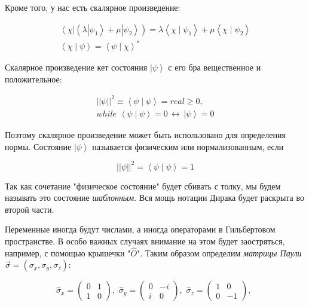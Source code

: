 \documentclass[main.tex]{subfiles}
\begin{document}
Кроме того, у нас есть скалярное произведение:

\begin{align}\label{inproduct}
	\left<\chi\right| \left( \lambda \left|\psi_1\right> + \mu\left|\psi_2\right> \right) = \lambda\left<\chi\mid\psi_1\right> + \mu\left<\chi\mid\psi_2\right> \\
	 \left<\chi\mid\psi\right> = \left<\psi\mid\chi\right>^*
\end{align}

Скалярное произведение кет состояния $\left|\psi\right>$ с его бра вещественное и положительное:

\begin{align}\label{1.2}
	||\psi||^2 \equiv \left<\psi\mid\psi\right> = real\ge 0,\\
	while \,\, \left<\psi\mid\psi\right> = 0 \,\leftrightarrow \, \left|\psi\right> = 0 
\end{align}

Поэтому скалярное произведение может быть использовано для определения нормы. Состояние $\left|\psi\right>$ называется физическим или нормализованным, если

\begin{equation}\label{norma}
	||\psi||^2 = \left<\psi\mid\psi\right> = 1
\end{equation}

Так как сочетание "физическое состояние" будет сбивать с толку, мы будем называть это состояние \textit{шаблонным}. Вся мощь нотации Дирака будет раскрыта во второй части.

Переменные иногда будут числами, а иногда операторами в Гильбертовом пространстве. В особо важных случаях внимание на этом будет заостряться, например, с помощью крышечки "$\hat O$". Таким образом определим \textit{матрицы Паули} $\vec\sigma = (\sigma_x, \sigma_y, \sigma_z)$:

\begin{equation}\label{norma}
	\hat \sigma_x = \begin{pmatrix}
 0&1 \\ 
 1&0 
\end{pmatrix}, \,\,
\hat \sigma_y = \begin{pmatrix}
 0&-i \\ 
 i&0 
\end{pmatrix}, \,\,
\hat \sigma_z = \begin{pmatrix}
1 &0 \\ 
 0& -1
\end{pmatrix}, \,\,
\end{equation}
\end{document}
